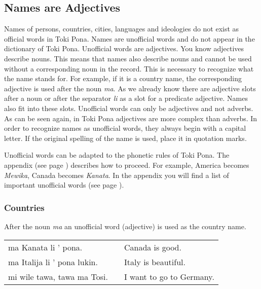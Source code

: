 \subsection*{Names are Adjectives}
\label{'unofficial_words_intro'}
%
%
Names of persons, countries, cities, languages and ideologies do not exist as official words in Toki Pona. 
Names are unofficial words and do not appear in the dictionary of Toki Pona.
Unofficial words are adjectives.
You know adjectives describe nouns. 
This means that names also describe nouns and cannot be used without a corresponding noun in the record.
This is necessary to recognize what the name stands for. 
For example, if it is a country name, the corresponding adjective is used after the noun \textit{ma}. 
As we already know there are adjective slots after a noun or after the separator \textit{li} as a slot for a predicate adjective. 
Names also fit into these slots.
Unofficial words can only be adjectives and not adverbs. 
As can be seen again, in Toki Pona adjectives are more complex than adverbs. 
In order to recognize names as unofficial words, they always begin with a capital letter. 
If the original spelling of the name is used, place it in quotation marks.

Unofficial words can be adapted to the phonetic rules of Toki Pona.
The appendix (see page \pageref{'phonet_trans'}) describes how to proceed.
For example, America becomes \textit{Mewika}, Canada becomes \textit{Kanata}.
In the appendix you will find a list of important unofficial words (see page \pageref{'unofficial_words'}). 
%
\subsubsection*{Countries}
%
After the noun \textit{ma} an unofficial word (adjective) is used as the country name. 

\begin{supertabular}{p{5,5cm}|ll}
ma Kanata li ' pona. && Canada is good. \\
ma Italija li ' pona lukin. && Italy is beautiful. \\
mi wile tawa, tawa ma Tosi. && I want to go to Germany. \\
\end{supertabular} 

